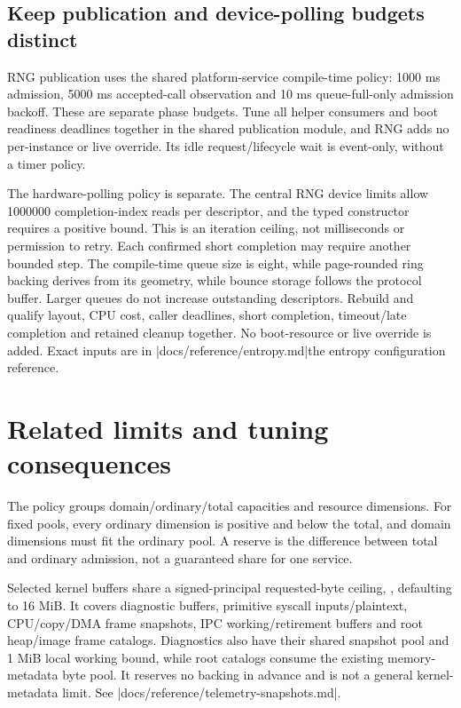 \subsection{Keep publication and device-polling budgets distinct}

RNG publication uses the shared platform-service compile-time policy: 1000 ms
admission, 5000 ms accepted-call observation and 10 ms queue-full-only admission
backoff. These are separate phase budgets. Tune all helper consumers and boot
readiness deadlines together in the shared publication module, and RNG adds no
per-instance or live override. Its idle request/lifecycle wait is event-only,
without a timer policy.

The hardware-polling policy is separate. The central RNG device limits allow
1000000 completion-index reads per descriptor, and the typed constructor requires a
positive bound. This is an iteration ceiling, not milliseconds or permission to
retry. Each confirmed short completion may require another bounded step. The
compile-time queue size is eight, while page-rounded ring backing derives from its
geometry, while bounce storage follows the protocol buffer. Larger queues do
not increase outstanding descriptors. Rebuild and qualify layout, CPU cost,
caller deadlines, short completion, timeout/late completion and retained cleanup
together. No boot-resource or live override is added. Exact inputs are in
\repofiletext|docs/reference/entropy.md|{the entropy configuration reference}.

\section{Related limits and tuning consequences}

The policy groups domain/ordinary/total capacities and resource dimensions.
For fixed pools, every ordinary dimension is positive and below the total, and
domain dimensions must fit the ordinary pool. A reserve is the difference
between total and ordinary admission, not a guaranteed share for one service.

Selected kernel buffers share a signed-principal requested-byte ceiling,
, defaulting to 16 MiB.
It covers diagnostic buffers, primitive syscall inputs/plaintext, CPU/copy/DMA
frame snapshots, IPC working/retirement buffers and root heap/image frame catalogs.
Diagnostics also have their shared snapshot pool and 1 MiB local working bound, while
root catalogs consume the existing memory-metadata byte pool. It reserves no backing in advance and is
not a general kernel-metadata limit. See
\repofile|docs/reference/telemetry-snapshots.md|.

